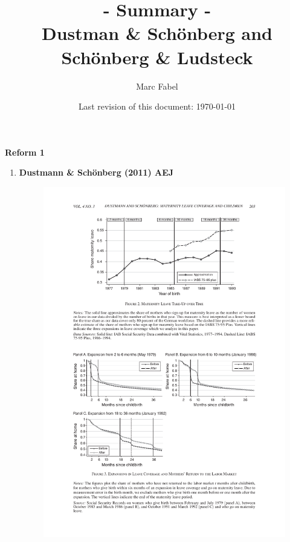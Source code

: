 \documentclass[10pt,a4paper]{article}
\author{Marc Fabel}
\date{Last revision of this document: \today}
\title{\centering - Summary - \\ Dustman \& Schönberg and Schönberg \& Ludsteck }
\begin{document}
\maketitle
\Large{\textbf{Reform 1}}\normalsize
\begin{enumerate}
\item \textbf{Dustmann \& Schönberg (2011) AEJ}
		
\begin{figure}
\includegraphics[width=\linewidth]{../../analysis/graphs/presentation/DS_R1_return_to_work.pdf}
\end{figure}

\end{enumerate}
\end{document}
